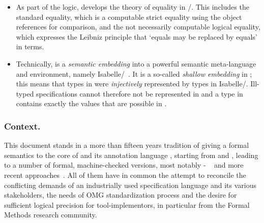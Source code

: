 \begin{itemize}
 \item As part of the \OCL logic,  \FOCL develops the theory of
         equality in \UML/\OCL. This includes the standard equality, which is a
         computable strict equality using the object references for comparison,
         and the not necessarily computable logical equality, which expresses
         the Leibniz principle that `equals may be replaced by equals' in 
         \OCL terms.
 \item Technically,  \FOCL is a \emph{semantic embedding} into a 
         powerful semantic meta-language and
         environment, namely Isabelle/\HOL~\cite{nipkow.ea:isabelle:2002}.
         It is a so-called \emph{shallow embedding} in \HOL; this means that types
         in \OCL were \emph{injectively} represented by types in Isabelle/\HOL. 
         Ill-typed \OCL specifications cannot therefore not be represented in
          \FOCL and a type in  \FOCL contains exactly
         the values that are possible in \OCL\@. 
\end{itemize}

\subsubsection{Context.} This document stands in a  more than fifteen years  tradition of 
giving a formal semantics to the core of \UML and its annotation language \OCL,
starting from \citet{richters:precise:2002} and   
\cite{hamie.ea:reflections:1998,mandel.ea:ocl:1999,cook.ea::amsterdam:2002},
leading to a number of formal, machine-checked versions, most notably \HOL-\OCL
~\cite{brucker.ea:semantic:2006-b,brucker.ea:hol-ocl-book:2006,brucker.ea:extensible:2008-b}
and more recent approaches~\cite{DBLP:conf/models/BruckerLTW13}. All of them
have in common
the attempt to reconcile the conflicting demands of an industrially used 
specification language and its various stakeholders, the needs of OMG 
standardization process and the desire for sufficient logical precision 
for tool-implementors, in particular from the Formal Methods research community.        

